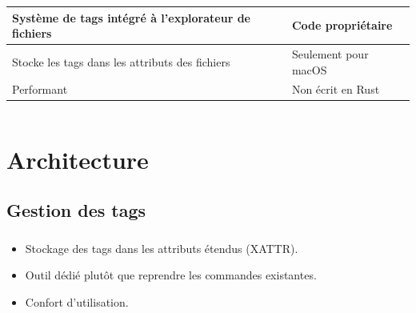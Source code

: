 \documentclass[10pt]{beamer}
\begin{document}
\begin{frame}
\begin{columns}[T]
\begin{column}{.45\textwidth}
\begin{flushleft}
\begin{tabularx}{5cm}{|X|X|}
                    Système de tags intégré à l'explorateur de fichiers & Code propriétaire \\ \hline
                    Stocke les tags dans les attributs des fichiers & Seulement pour macOS \\ \hline
                    Performant & Non écrit en Rust \\ \hline
                \end{tabularx}
            \end{flushleft}
        \end{column}
    \end{columns}
\end{frame}

\section{Architecture}
\subsection{Gestion des tags}
\begin{frame}
    \frametitle{\subsecname}
    \begin{itemize}
        \item Stockage des tags dans les attributs étendus (XATTR).
        \item Outil dédié plutôt que reprendre les commandes existantes.
        \item Confort d'utilisation.
    \end{itemize}
\end{frame}
\end{document}
